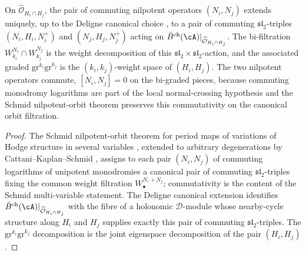 \begin{lemma}
\label{lem:sl2-sl2-splitting}
\ClaimStatusProvedElsewhere
{}%
On $\widehat{\mathcal{O}}_{H_i\cap H_j}$, the pair of commuting
nilpotent operators $(N_i,N_j)$ extends uniquely, up to the Deligne
canonical choice \cite[\S 2.1]{CattaniKaplanSchmid1986}, to a pair of
commuting $\mathfrak{sl}_2$-triples $(N_i,H_i,N^+_i)$ and
$(N_j,H_j,N^+_j)$ acting on
$\bar B^{\mathrm{ch}}(\cA)|_{\widehat{\mathcal{O}}_{H_i\cap H_j}}$.
The bi-filtration $W^{N_i}_{k_i}\cap W^{N_j}_{k_j}$ is the weight
decomposition of this $\mathfrak{sl}_2\times\mathfrak{sl}_2$-action,
and the associated graded $\mathrm{gr}^{k_i}\mathrm{gr}^{k_j}$ is the
$(k_i,k_j)$-weight space of $(H_i,H_j)$. The two nilpotent operators
commute, $[N_i,N_j]=0$ on the bi-graded pieces, because commuting
monodromy logarithms are part of the local normal-crossing hypothesis
and the Schmid nilpotent-orbit theorem \cite[Thm.~4.9]{Schmid1973}
preserves this commutativity on the canonical orbit filtration.
\end{lemma}

\begin{proof}
The Schmid nilpotent-orbit theorem for period maps of variations of
Hodge structure in several variables \cite[Thm.~4.9]{Schmid1973},
extended to arbitrary degenerations by Cattani--Kaplan--Schmid
\cite[\S 2.1]{CattaniKaplanSchmid1986}, assigns to each pair
$(N_i,N_j)$ of commuting logarithms of unipotent monodromies a
canonical pair of commuting $\mathfrak{sl}_2$-triples fixing the
common weight filtration $W^{N_i+N_j}_\bullet$; commutativity is the
content of the Schmid multi-variable statement. The Deligne canonical
extension \cite[\S 5]{Deligne1970} identifies
$\bar B^{\mathrm{ch}}(\cA)|_{\widehat{\mathcal{O}}_{H_i\cap H_j}}$
with the fibre of a holonomic $\mathcal{D}$-module whose
nearby-cycle structure along $H_i$ and $H_j$ supplies exactly this
pair of commuting $\mathfrak{sl}_2$-triples. The
$\mathrm{gr}^{k_i}\mathrm{gr}^{k_j}$ decomposition is the joint
eigenspace decomposition of the pair $(H_i,H_j)$.
\end{proof}

